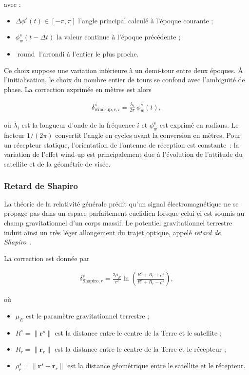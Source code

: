 avec :
\begin{itemize}
    \item $\Delta\phi^s(t)\in[-\pi,\pi]$ l'angle principal calculé à l'époque courante ;
    \item $\phi_w^s(t-\Delta t)$ la valeur continue à l'époque précédente ;
    \item $\operatorname{round}$ l'arrondi à l'entier le plus proche.
\end{itemize}
Ce choix suppose une variation inférieure à un demi-tour entre deux époques.
À l'initialisation, le choix du nombre entier de tours se confond avec
l'ambiguïté de phase. La correction exprimée en mètres est alors

\begin{align}
\delta_{\mathrm{wind\text{-}up},r,i}^s
=
\frac{\lambda_i}{2\pi}\,\phi_w^s(t),
\label{eq:windup}
\end{align}

où $\lambda_i$ est la longueur d'onde de la fréquence $i$ et $\phi_w^s$ est
exprimé en radians. Le facteur $1/(2\pi)$ convertit l'angle en cycles avant la
conversion en mètres. Pour un récepteur statique, l'orientation de l'antenne
de réception est constante~: la variation de l'effet wind-up est
principalement due à l'évolution de l'attitude du satellite et de la géométrie
de visée.


\subsubsection{Retard de Shapiro}\label{shapiro}

La théorie de la relativité générale prédit qu'un signal électromagnétique ne se propage pas dans un espace parfaitement euclidien lorsque celui-ci est soumis au champ gravitationnel d'un corps massif. Le potentiel gravitationnel terrestre induit ainsi un très léger allongement du trajet optique, appelé \textit{retard de Shapiro}~\cite{ashby2003}.

La correction est donnée par

\begin{align}
\delta_{\mathrm{Shapiro},r}^s
=
\frac{2\mu_E}{c^2}
\ln
\left(
\frac{R^s+R_r+\rho_r^s}
     {R^s+R_r-\rho_r^s}
\right),
\end{align}

où

\begin{itemize}
    \item $\mu_E$ est le paramètre gravitationnel terrestre ;
    \item $R^s = \|\mathbf r^s\|$ est la distance entre le centre de la Terre et le satellite ;
    \item $R_r = \|\mathbf r_r\|$ est la distance entre le centre de la Terre et le récepteur ;
    \item $\rho_r^s = \|\mathbf r^s - \mathbf r_r\|$ est la distance géométrique entre le satellite et le récepteur.
\end{itemize}

